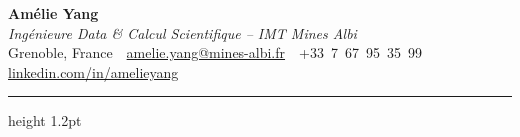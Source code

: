 \documentclass[10.5pt,a4paper]{article}
\begin{document}
\begin{center}
  {\fontsize{26}{30}\selectfont\bfseries Amélie Yang}\\[4pt]
  {\color{accent}\itshape\large Ingénieure Data \& Calcul Scientifique -- IMT Mines Albi}\\[6pt]
  {\small
    Grenoble, France
    \,\textbullet\,
    \href{mailto:amelie.yang@mines-albi.fr}{amelie.yang@mines-albi.fr}
    \,\textbullet\,
    +33~7~67~95~35~99
    \,\textbullet\,
    \href{https://www.linkedin.com/in/amelieyang}{linkedin.com/in/amelieyang}
  }
\end{center}

\vspace{3pt}
{\color{accent}\hrule height 1.2pt}
\vspace{4pt}
\end{document}
